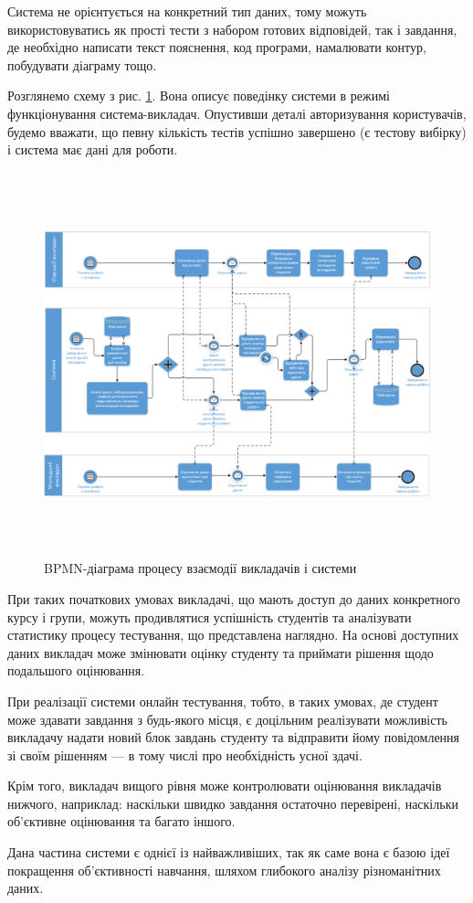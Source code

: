 Система не орієнтується на конкретний тип даних, тому можуть використовуватись
як прості тести з набором готових відповідей, так і завдання, де необхідно
написати текст пояснення, код програми, намалювати контур, побудувати діаграму
тощо.

Розглянемо схему з рис. \ref{fig:bpmn_teachers}.
Вона описує поведінку системи в режимі функціонування система-викладач.
Опустивши деталі авторизування користувачів, будемо вважати, що певну кількість
тестів успішно завершено (є тестову вибірку) і система має дані для роботи.

\begin{figure}[b!]
    \center\includegraphics[height=30em,angle=-90]{images/bpmn_teachers.png}
    \caption{BPMN-діаграма процесу взаємодії викладачів і системи}
    \label{fig:bpmn_teachers}
\end{figure}

При таких початкових умовах викладачі, що мають доступ до даних конкретного
курсу і групи, можуть продивлятися успішність студентів та аналізувати
статистику процесу тестування, що представлена наглядно.
На основі доступних даних викладач може змінювати оцінку студенту та
приймати рішення щодо подальшого оцінювання.

При реалізації системи онлайн тестування, тобто, в таких умовах, де студент може
здавати завдання з будь-якого місця, є доцільним реалізувати можливість
викладачу надати новий блок завдань студенту та відправити йому
повідомлення зі своїм рішенням --- в тому числі про необхідність усної здачі.

Крім того, викладач вищого рівня може контролювати оцінювання викладачів нижчого, наприклад: наскільки швидко завдання остаточно перевірені, наскільки об’єктивне оцінювання та багато іншого.

Дана частина системи є однієї із найважливіших, так як саме вона є базою ідеї покращення об’єктивності навчання, шляхом глибокого аналізу різноманітних даних.
